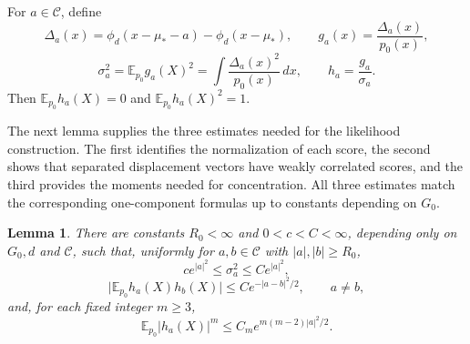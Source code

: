 \documentclass[11pt]{article}
\newtheorem{lemma}[theorem]{Lemma}
\theoremstyle{definition}
\numberwithin{equation}{section}
\newcommand{\E}{\mathbb{E}}
\begin{document}
For \(a\in\mathcal C\), define
\[
    \Delta_a(x)=\phi_d(x-\mu_*-a)-\phi_d(x-\mu_*),
    \qquad
    g_a(x)=\frac{\Delta_a(x)}{p_0(x)},
\]
\[
    \sigma_a^2=\E_{p_0}g_a(X)^2
    =\int \frac{\Delta_a(x)^2}{p_0(x)}\,dx,
    \qquad
    h_a=\frac{g_a}{\sigma_a}.
\]
Then \(\E_{p_0}h_a(X)=0\) and \(\E_{p_0}h_a(X)^2=1\).

The next lemma supplies the three estimates needed for the likelihood
construction. The first identifies the normalization of each score, the
second shows that separated displacement vectors have weakly correlated
scores, and the third provides the moments needed for concentration. All
three estimates match the corresponding one-component formulas up to
constants depending on \(G_0\).

\begin{lemma}
\label{lem:gaussian-exposed-scores}
There are constants \(R_0<\infty\) and \(0<c<C<\infty\), depending only on \(G_0,d\) and \(\mathcal C\), such that, uniformly for \(a,b\in\mathcal C\) with \(|a|,|b|\ge R_0\),
\[
    c e^{|a|^2}\le \sigma_a^2\le C e^{|a|^2},
\]
\[
    \bigl|\E_{p_0}h_a(X)h_b(X)\bigr|
    \le
    C e^{-|a-b|^2/2},
    \qquad a\ne b,
\]
and, for each fixed integer \(m\ge3\),
\[
    \E_{p_0}|h_a(X)|^m
    \le
    C_m e^{m(m-2)|a|^2/2}.
\]
\end{lemma}
\end{document}
